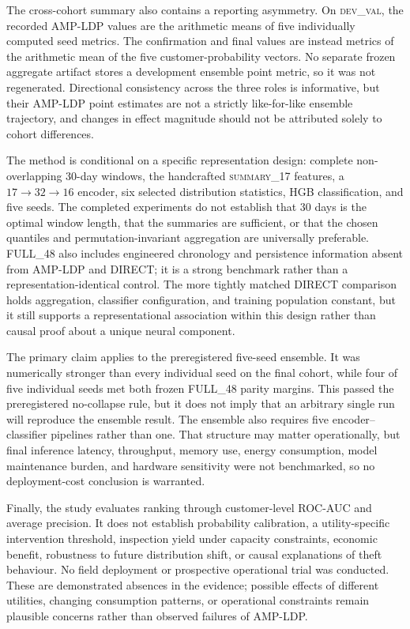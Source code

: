 The cross-cohort summary also contains a reporting asymmetry. On \textsc{dev\_val}, the recorded AMP-LDP values are the arithmetic means of five individually computed seed metrics. The confirmation and final values are instead metrics of the arithmetic mean of the five customer-probability vectors. No separate frozen aggregate artifact stores a development ensemble point metric, so it was not regenerated. Directional consistency across the three roles is informative, but their AMP-LDP point estimates are not a strictly like-for-like ensemble trajectory, and changes in effect magnitude should not be attributed solely to cohort differences.

The method is conditional on a specific representation design: complete non-overlapping 30-day windows, the handcrafted \textsc{summary\_17} features, a $17\rightarrow32\rightarrow16$ encoder, six selected distribution statistics, HGB classification, and five seeds. The completed experiments do not establish that 30 days is the optimal window length, that the summaries are sufficient, or that the chosen quantiles and permutation-invariant aggregation are universally preferable. FULL\_48 also includes engineered chronology and persistence information absent from AMP-LDP and DIRECT; it is a strong benchmark rather than a representation-identical control. The more tightly matched DIRECT comparison holds aggregation, classifier configuration, and training population constant, but it still supports a representational association within this design rather than causal proof about a unique neural component.

The primary claim applies to the preregistered five-seed ensemble. It was numerically stronger than every individual seed on the final cohort, while four of five individual seeds met both frozen FULL\_48 parity margins. This passed the preregistered no-collapse rule, but it does not imply that an arbitrary single run will reproduce the ensemble result. The ensemble also requires five encoder--classifier pipelines rather than one. That structure may matter operationally, but final inference latency, throughput, memory use, energy consumption, model maintenance burden, and hardware sensitivity were not benchmarked, so no deployment-cost conclusion is warranted.

Finally, the study evaluates ranking through customer-level ROC-AUC and average precision. It does not establish probability calibration, a utility-specific intervention threshold, inspection yield under capacity constraints, economic benefit, robustness to future distribution shift, or causal explanations of theft behaviour. No field deployment or prospective operational trial was conducted. These are demonstrated absences in the evidence; possible effects of different utilities, changing consumption patterns, or operational constraints remain plausible concerns rather than observed failures of AMP-LDP.
